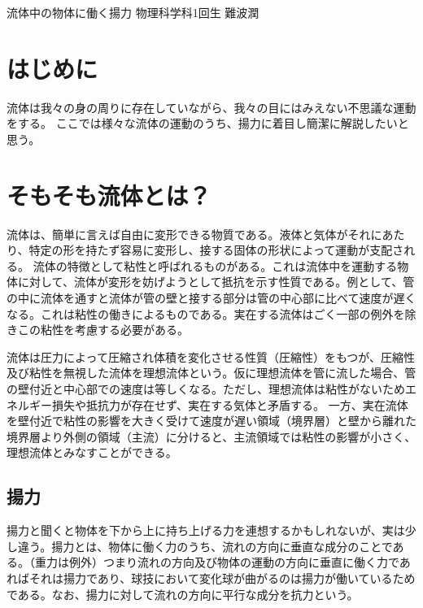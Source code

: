 \documentclass[10pt,b5paper,papersize,dvipdfmx]{jsbook}
\begin{document}


\kaishititle%
  {流体中の物体に働く揚力}%
  {物理科学科1回生}%
  {難波潤}%

%
\section*{はじめに}
流体は我々の身の周りに存在していながら、我々の目にはみえない不思議な運動をする。
ここでは様々な流体の運動のうち、揚力に着目し簡潔に解説したいと思う。
\par
\section{そもそも流体とは？}
流体は、簡単に言えば自由に変形できる物質である。液体と気体がそれにあたり、特定の形を持たず容易に変形し、接する固体の形状によって運動が支配される。
流体の特徴として粘性と呼ばれるものがある。これは流体中を運動する物体に対して、流体が変形を妨げようとして抵抗を示す性質である。例として、管の中に流体を通すと流体が管の壁と接する部分は管の中心部に比べて速度が遅くなる。これは粘性の働きによるものである。実在する流体はごく一部の例外を除きこの粘性を考慮する必要がある。
\par
流体は圧力によって圧縮され体積を変化させる性質（圧縮性）をもつが、圧縮性及び粘性を無視した流体を理想流体という。仮に理想流体を管に流した場合、管の壁付近と中心部での速度は等しくなる。ただし、理想流体は粘性がないためエネルギー損失や抵抗力が存在せず、実在する気体と矛盾する。
一方、実在流体を壁付近で粘性の影響を大きく受けて速度が遅い領域（境界層）と壁から離れた境界層より外側の領域（主流）に分けると、主流領域では粘性の影響が小さく、理想流体とみなすことができる。
\par
\subsection{揚力}
揚力と聞くと物体を下から上に持ち上げる力を連想するかもしれないが、実は少し違う。揚力とは、物体に働く力のうち、流れの方向に垂直な成分のことである。（重力は例外）つまり流れの方向及び物体の運動の方向に垂直に働く力であればそれは揚力であり、球技において変化球が曲がるのは揚力が働いているためである。なお、揚力に対して流れの方向に平行な成分を抗力という。
\par
\end{document}
